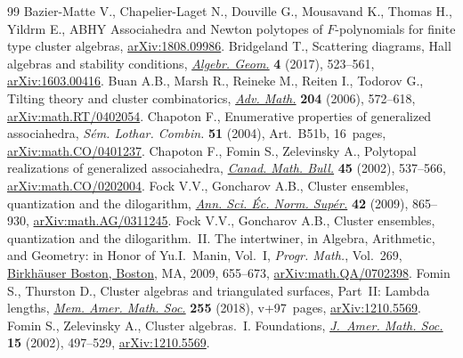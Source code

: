 \documentclass[pdftex]{sigma}
\numberwithin{equation}{section}
\begin{document}
\begin{thebibliography}{99}
\footnotesize\itemsep=0pt
Bazier-Matte V., Chapelier-Laget N., Douville G., Mousavand K., Thomas H.,
 Yildrm E., {ABHY} Associahedra and Newton polytopes of ${F}$-polynomials for
 finite type cluster algebras, \href{https://arxiv.org/abs/1808.09986}{arXiv:1808.09986}.
Bridgeland T., Scattering diagrams, {H}all algebras and stability conditions,
 \href{https://doi.org/10.14231/2017-027}{\textit{Algebr. Geom.}} \textbf{4} (2017), 523--561, \href{https://arxiv.org/abs/1603.00416}{arXiv:1603.00416}.
Buan A.B., Marsh R., Reineke M., Reiten I., Todorov G., Tilting theory and
 cluster combinatorics, \href{https://doi.org/10.1016/j.aim.2005.06.003}{\textit{Adv. Math.}} \textbf{204} (2006), 572--618,
 \href{https://arxiv.org/abs/math.RT/0402054}{arXiv:math.RT/0402054}.
Chapoton F., Enumerative properties of generalized associahedra, \textit{S\'em.
 Lothar. Combin.} \textbf{51} (2004), Art.~B51b, 16~pages,
 \href{https://arxiv.org/abs/math.CO/0401237}{arXiv:math.CO/0401237}.
Chapoton F., Fomin S., Zelevinsky A., Polytopal realizations of generalized
 associahedra, \href{https://doi.org/10.4153/CMB-2002-054-1}{\textit{Canad. Math. Bull.}} \textbf{45} (2002), 537--566,
 \href{https://arxiv.org/abs/math.CO/0202004}{arXiv:math.CO/0202004}.
Fock V.V., Goncharov A.B., Cluster ensembles, quantization and the dilogarithm,
 \href{https://doi.org/10.24033/asens.2112}{\textit{Ann. Sci. \'Ec. Norm. Sup\'er.}} \textbf{42} (2009), 865--930,
 \href{https://arxiv.org/abs/math.AG/0311245}{arXiv:math.AG/0311245}.
Fock V.V., Goncharov A.B., Cluster ensembles, quantization and the
 dilogarithm.~{II}. {T}he intertwiner, in Algebra, Arithmetic, and Geometry:
 in Honor of {Y}u.{I}.~{M}anin, {V}ol.~{I}, \textit{Progr. Math.}, Vol.~269,
 \href{https://doi.org/10.1007/978-0-8176-4745-2_15}{Birkh\"auser Boston, Boston}, MA, 2009, 655--673,
 \href{https://arxiv.org/abs/math.QA/0702398}{arXiv:math.QA/0702398}.
Fomin S., Thurston D., Cluster algebras and triangulated surfaces, {P}art~{II}:
 {L}ambda lengths, \href{https://doi.org/10.1090/memo/1223}{\textit{Mem. Amer. Math. Soc.}} \textbf{255} (2018),
 v+97~pages, \href{https://arxiv.org/abs/1210.5569}{arXiv:1210.5569}.
Fomin S., Zelevinsky A., Cluster algebras.~{I}. {F}oundations, \href{https://doi.org/10.1090/S0894-0347-01-00385-X}{\textit{J.~Amer.
 Math. Soc.}} \textbf{15} (2002), 497--529, \href{https://arxiv.org/abs/1210.5569}{arXiv:1210.5569}.

\end{thebibliography}
\end{document}
